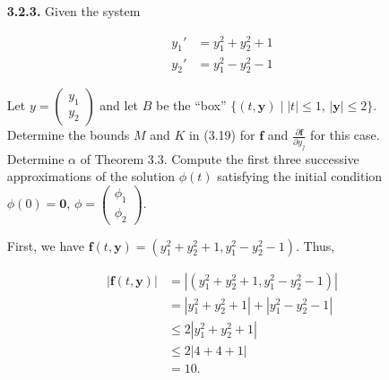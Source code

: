 \documentclass[11pt,oneside,english]{amsart}
\theoremstyle{definition}
\newcommand{\pp}[2]{\frac{\partial{#1}}{\partial{#2}}}
\begin{document}
\begin{enumerate}
\begin{enumerate}
\begin{proof}
By the definition of the limit function $\phi(t)$, and the suggestions above, we have

\begin{align*}
\phi(t)&=\phi_0(t)+\sum_{n=0}^\infty\left(\phi_{n+1}(t)-\phi_n(t)\right)\\[2mm]
|\phi(t)|&\leq|\phi_0(t)|+\sum_{n=0}^\infty\left|\phi_{n+1}(t)-\phi_n(t)\right|\\[2mm]
&\leq0+\sum_{n=0}^\infty\frac{|\alpha|^n}{n!t^n}\\[2mm]
&=e^\frac{|\alpha|}{t}\\[2mm]
&\leq e^{|\alpha|}.
\end{align*}
\end{proof}
\end{enumerate}



\pagebreak

\item[\textbf{3.2.3.}] Given the system

\begin{align*}
y_1'&=y_1^2+y_2^2+1\\[2mm]
y_2'&=y_1^2-y_2^2-1
\end{align*}

Let $\displaystyle y=\begin{pmatrix}y_1\\y_2\end{pmatrix}$ and let $B$ be the ``box'' $\{(t,\mathbf{y})\mid |t|\leq 1,\,|\mathbf{y}|\leq 2\}$. Determine the bounds $M$ and $K$ in (3.19) for $\mathbf{f}$ and $\pp{\mathbf{f}}{y_j}$ for this case. Determine $\alpha$ of Theorem 3.3. Compute the first three successive approximations of the solution $\phi(t)$ satisfying the initial condition $\phi(0)=\mathbf{0}$, $\displaystyle \phi=\begin{pmatrix}\phi_1\\ \phi_2\end{pmatrix}$.


First, we have $\mathbf{f}(t,\mathbf{y})=\left(y_1^2+y_2^2+1,y_1^2-y_2^2-1\right)$. Thus,

\begin{align*}
|\mathbf{f}(t,\mathbf{y})|&=\left|(y_1^2+y_2^2+1,y_1^2-y_2^2-1)\right|\\[2mm]
&=|y_1^2+y_2^2+1|+|y_1^2-y_2^2-1|\\[2mm]
&\leq2|y_1^2+y_2^2+1|\\[2mm]
&\leq2|4+4+1|\\[2mm]
&=10.
\end{align*}


\end{enumerate}
\end{document}

